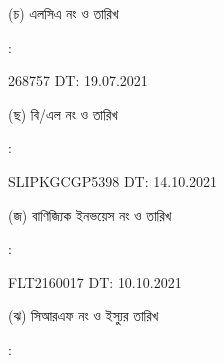 \documentclass[12pt]{article}
\newcommand{\lcdt}{19.07.2021}
\newcommand{\lcano}{268757}
\newcommand{\lcadt}{{\lcdt}}
\newcommand{\invno}{FLT2160017}
\newcommand{\invdt}{10.10.2021}
\newcommand{\blno}{SLIPKGCGP5398}
\newcommand{\bldt}{14.10.2021}
\begin{document}
\begin{minipage}[t]{0.05\linewidth}
\hspace*{1em}
\end{minipage}
\begin{minipage}[t]{0.40\linewidth}
(চ) এলসিএ নং ও তারিখ
\end{minipage}
\begin{minipage}[t]{0.02\linewidth}
:
\end{minipage}
\begin{minipage}[t]{0.53\linewidth}
{\lcano} \hspace{2em} DT: {\lcadt}
\\
\end{minipage}
\begin{minipage}[t]{0.05\linewidth}
\hspace*{1em}
\end{minipage}
\begin{minipage}[t]{0.40\linewidth}
(ছ) বি/এল নং ও তারিখ
\end{minipage}
\begin{minipage}[t]{0.02\linewidth}
:
\end{minipage}
\begin{minipage}[t]{0.53\linewidth}
{\blno} \hspace{2em} DT: {\bldt}
\\
\end{minipage}
\begin{minipage}[t]{0.05\linewidth}
\hspace*{1em}
\end{minipage}
\begin{minipage}[t]{0.40\linewidth}
(জ) বাণিজ্যিক ইনভয়েস নং ও তারিখ
\end{minipage}
\begin{minipage}[t]{0.02\linewidth}
:
\end{minipage}
\begin{minipage}[t]{0.53\linewidth}
{\invno} \hspace{2em} DT: {\invdt}
\\
\end{minipage}
\begin{minipage}[t]{0.05\linewidth}
\hspace*{1em}
\end{minipage}
\begin{minipage}[t]{0.40\linewidth}
(ঝ) সিআরএফ নং ও ইস্যুর তারিখ
\end{minipage}
\begin{minipage}[t]{0.02\linewidth}
:
\end{minipage}
\end{document}
